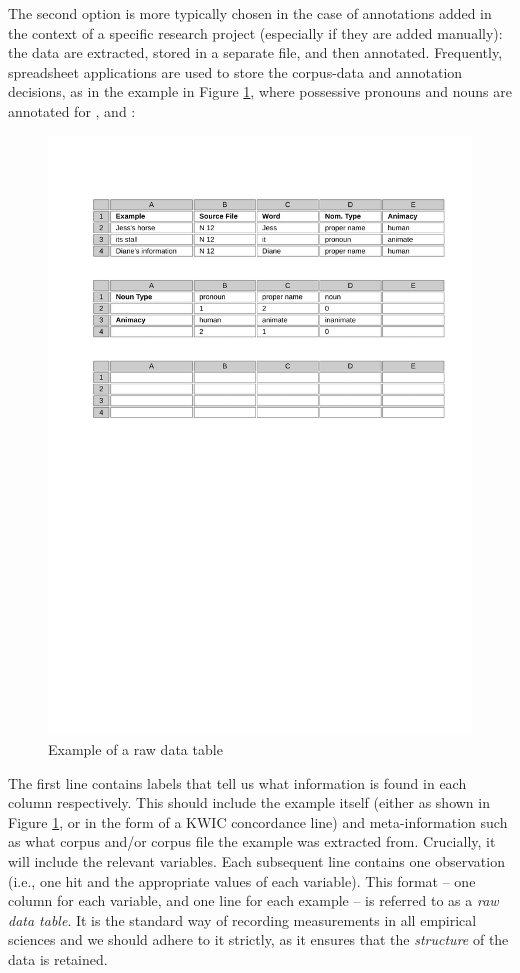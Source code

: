 The second option is more typically chosen in the case of annotations added in the context of a specific research project (especially if they are added manually): the data are extracted, stored in a separate file, and then annotated. Frequently, spreadsheet applications are used to store the corpus-data and annotation decisions, as in the example in Figure \ref{fig:storingdataright}, where possessive pronouns and nouns are annotated for ,  and :

\begin{figure}[!htbp]
\caption{Example of a raw data table}
\label{fig:storingdataright}
\includegraphics[width=\textwidth,keepaspectratio]{figures/storingdataright}
\end{figure}

The first line contains labels that tell us what information is found in each column respectively. This should include the example itself (either as shown in Figure \ref{fig:storingdataright}, or in the form of a KWIC concordance line) and meta-information such as what corpus and/or corpus file the example was extracted from. Crucially, it will include the relevant variables. Each subsequent line contains one observation (i.e., one hit and the appropriate values of each variable). This format -- one column for each variable, and one line for each example -- is referred to as a \textit{raw data table}. It is the standard way of recording measurements in all empirical sciences and we should adhere to it strictly, as it ensures that the \emph{structure} of the data is retained.

